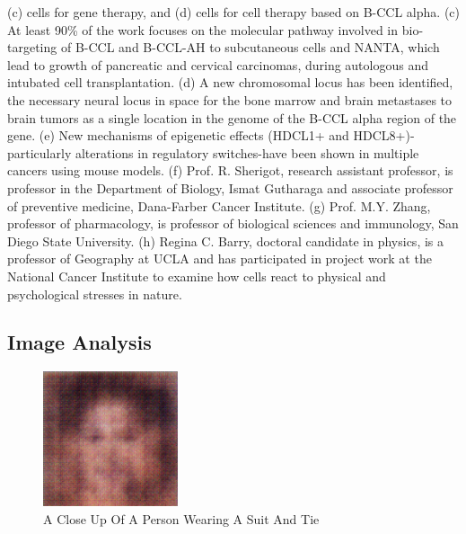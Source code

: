 \documentclass{article}%
\begin{document}
(c) cells for gene therapy, and\newline%
(d) cells for cell therapy based on B{-}CCL alpha.\newline%
(c) At least 90\% of the work focuses on the molecular pathway involved in bio{-}targeting of B{-}CCL and B{-}CCL{-}AH to subcutaneous cells and NANTA, which lead to growth of pancreatic and cervical carcinomas, during autologous and intubated cell transplantation.\newline%
(d) A new chromosomal locus has been identified, the necessary neural locus in space for the bone marrow and brain metastases to brain tumors as a single location in the genome of the B{-}CCL alpha region of the gene.\newline%
(e) New mechanisms of epigenetic effects (HDCL1+ and HDCL8+){-}particularly alterations in regulatory switches{-}have been shown in multiple cancers using mouse models.\newline%
(f) Prof. R. Sherigot, research assistant professor, is professor in the Department of Biology, Ismat Gutharaga and associate professor of preventive medicine, Dana{-}Farber Cancer Institute.\newline%
(g) Prof. M.Y. Zhang, professor of pharmacology, is professor of biological sciences and immunology, San Diego State University.\newline%
(h) Regina C. Barry, doctoral candidate in physics, is a professor of Geography at UCLA and has participated in project work at the National Cancer Institute to examine how cells react to physical and psychological stresses in nature.

%
\subsection{Image Analysis}%
\label{subsec:ImageAnalysis}%


\begin{figure}[h!]%
\centering%
\includegraphics[width=150px]{500_fake_images/samples_5_198.png}%
\caption{A Close Up Of A Person Wearing A Suit And Tie}%
\end{figure}

%
\end{document}
